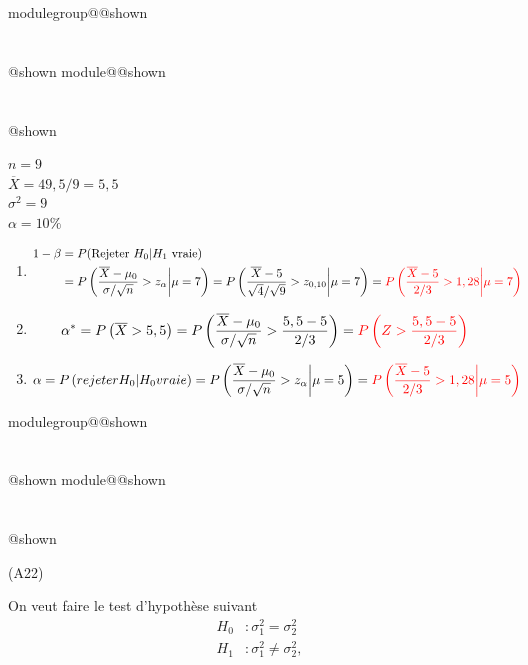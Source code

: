 \documentclass{Evaluation}
\makeatletter
\newcommand{\currentmodulekey}{}
\newcommand{\currentmoduletitle}{}
\newcommand{\currentgroupkey}{}
\newcommand{\currentgrouptitle}{}
\newcommand{\showmoduleifneeded}{%
  \ifx\currentgroupkey\empty\else
    \expandafter\ifx\csname modulegroup@\currentgroupkey @shown\endcsname\relax
      \section*{\currentgrouptitle}%
      \expandafter\gdef\csname modulegroup@\currentgroupkey @shown\endcsname{1}%
    \fi
  \fi
  \expandafter\ifx\csname module@\currentmodulekey @shown\endcsname\relax
    \section*{\currentmoduletitle}%
    \expandafter\gdef\csname module@\currentmodulekey @shown\endcsname{1}%
  \fi
}
\newenvironment{A22}{\showmoduleifneeded}{}
\makeatother
\begin{document}
\begin{questions}
\begin{A22}
\begin{solution}
	$n = 9$\\
	$\overline{X}=49,5/9 = 5,5$\\
	$\sigma^2 = 9$\\
	$\alpha=10\%$
	\begin{enumerate}
		\item \begin{align*}
		1-\beta 
		&= P(\text{Rejeter}~ H_0| H_1~ \text{vraie}) \cr
		&= P\left( \frac{\overline{X}-\mu_0}{\sigma/\sqrt{n}} > z_{\alpha}\bigg| \mu = 7 \right) 
		= P\left( \frac{\overline{X}-5}{ \sqrt{4} /\sqrt{9}} > z_{0,10}\bigg| \mu = 7 \right) 
		= {\color{red} P\left( \frac{\overline{X}-5}{ 2 / 3} > 1,28 \bigg| \mu = 7 \right) }
		\end{align*}
		\item \begin{align*}
			\alpha^* &= P\left(\overline{X} > 5,5\right)
			= P\left(\frac{\overline{X} - \mu_0}{\sigma/\sqrt{n}} > \frac{5,5-5}{2/3} \right)
			=  {\color{red} P\left( Z > \frac{5,5-5}{2/3} \right) }
		\end{align*}
		\item \begin{align*}
		\alpha &= P\left(rejeter H_0 | H_0 vraie \right)
		= P\left(\frac{\overline{X} - \mu_0}{\sigma/\sqrt{n}} > z_\alpha \bigg| \mu=5 \right)
		=  {\color{red} P\left( \frac{\overline{X} - 5}{2/3} > 1,28 \bigg| \mu=5 \right) }
		\end{align*}
	\end{enumerate}
\end{solution}

\end{A22}

\begin{A22}
\question
(A22)

On veut faire le test d'hypothèse suivant 
\begin{align*}
H_0 &:\sigma_1^2 = \sigma_2^2\\
H_1 &:\sigma_1^2 \neq \sigma_2^2,
\end{align*}


\end{A22}
\end{questions}
\end{document}
